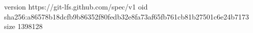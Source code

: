 version https://git-lfs.github.com/spec/v1
oid sha256:a86578b18dcfb9b86352f80fedb32e8fa73af65fb761cb81b27501c6e24b7173
size 1398128
